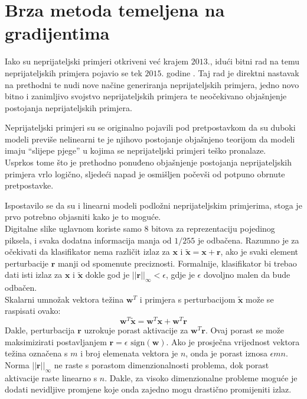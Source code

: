 \documentclass[utf8, diplomski]{fer}
\begin{document}
\section{Brza metoda temeljena na gradijentima}\label{fgm}
Iako su neprijateljski primjeri otkriveni već krajem $2013.$, idući bitni rad na temu neprijateljskih primjera pojavio se tek $2015.$ godine \citep{Goodfellow2015ExplainingAH}. Taj rad je direktni nastavak na prethodni te nudi nove načine generiranja neprijateljskih primjera, jedno novo bitno i zanimljivo svojstvo neprijateljskih primjera te neočekivano objašnjenje postojanja neprijateljskih primjera.
\par
Neprijateljski primjeri su se originalno pojavili pod pretpostavkom da su duboki modeli previše nelinearni te je njihovo postojanje objašnjeno teorijom da modeli imaju ``slijepe pjege'' u kojima se neprijateljski primjeri teško pronalaze. \\
Usprkos tome što je prethodno ponuđeno objašnjenje postojanja neprijateljskih primjera vrlo logično, sljedeći napad je osmišljen počevši od potpuno obrnute pretpostavke.
\par
Ispostavilo se da su i linearni modeli podložni neprijateljskim primjerima, stoga je prvo potrebno objasniti kako je to moguće. \\
Digitalne slike uglavnom koriste samo 8 bitova za reprezentaciju pojedinog piksela, i svaka dodatna informacija manja od $1/255$ je odbačena. Razumno je za očekivati da klasifikator nema različit izlaz za $\boldsymbol{x}$ i $\boldsymbol{\tilde{x}} = \boldsymbol{x} + \boldsymbol{r}$, ako je svaki element perturbacije $\boldsymbol{r}$ manji od spomenute preciznosti. Formalnije, klasifikator bi trebao dati isti izlaz za $\boldsymbol{x}$ i $\boldsymbol{\tilde{x}}$ dokle god je $||\boldsymbol{r}||_{\infty} < \epsilon$, gdje je $\epsilon$ dovoljno malen da bude odbačen. \\
Skalarni umnožak vektora težina $\boldsymbol{w}^{T}$ i primjera s perturbacijom $\boldsymbol{\tilde{x}}$ može se raspisati ovako:
\begin{equation}
	\boldsymbol{w}^{T}\boldsymbol{\tilde{x}} = \boldsymbol{w}^{T}\boldsymbol{x} + \boldsymbol{w}^{T}\boldsymbol{r}
\end{equation}
Dakle, perturbacija $\boldsymbol{r}$ uzrokuje porast aktivacije za $\boldsymbol{w}^{T}\boldsymbol{r}$. Ovaj porast se može maksimizirati postavljanjem $\boldsymbol{r} = \epsilon \text{ sign}(\boldsymbol{w})$. Ako je prosječna vrijednost vektora težina označena s $m$ i broj elemenata vektora je $n$, onda je porast iznosa $\epsilon mn$. Norma $||\boldsymbol{r}||_{\infty}$ ne raste s porastom dimenzionalnosti problema, dok porast aktivacije raste linearno s $n$. Dakle, za visoko dimenzionalne probleme moguće je dodati nevidljive promjene koje onda zajedno mogu drastično promijeniti izlaz.
\end{document}
